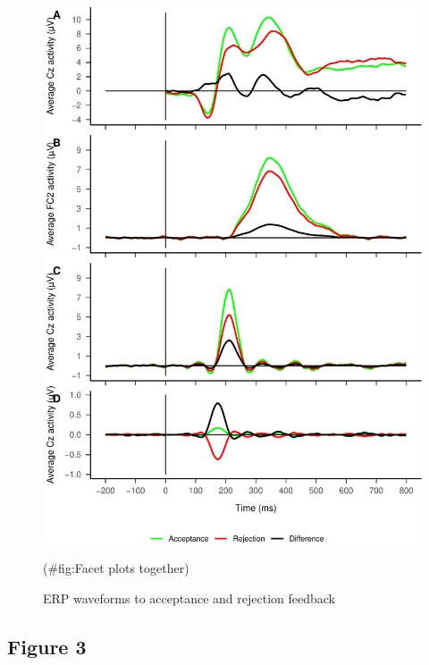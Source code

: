 \documentclass[english,man,floatsintext]{apa6}
\begin{document}
\begin{figure}

{\centering \includegraphics[width=1\linewidth]{DISS_tablesfigures_files/figure-latex/Facet plots together-1} 

}

\caption{ERP waveforms to acceptance and rejection feedback}(\#fig:Facet plots together)
\end{figure}

\hypertarget{figure-3}{%
\subsection{Figure 3}\label{figure-3}}
\end{document}
